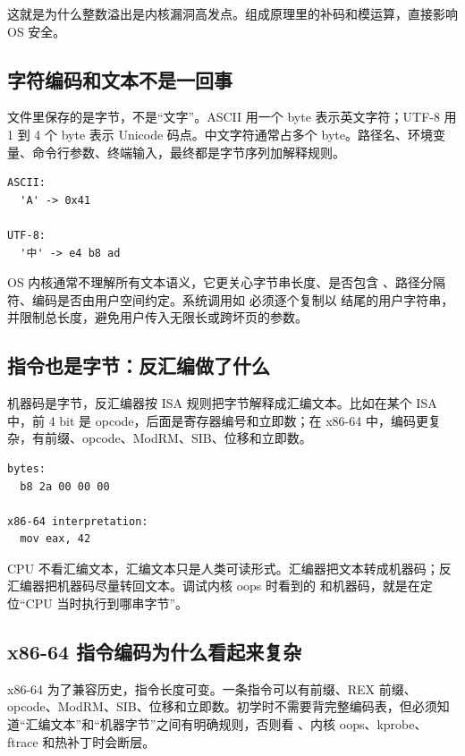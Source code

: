 这就是为什么整数溢出是内核漏洞高发点。组成原理里的补码和模运算，直接影响 OS 安全。

\subsection{字符编码和文本不是一回事}

文件里保存的是字节，不是“文字”。ASCII 用一个 byte 表示英文字符；UTF-8 用 1 到 4 个 byte 表示 Unicode 码点。中文字符通常占多个 byte。路径名、环境变量、命令行参数、终端输入，最终都是字节序列加解释规则。

\begin{lstlisting}
ASCII:
  'A' -> 0x41

UTF-8:
  '中' -> e4 b8 ad
\end{lstlisting}

OS 内核通常不理解所有文本语义，它更关心字节串长度、是否包含 、路径分隔符、编码是否由用户空间约定。系统调用如  必须逐个复制以  结尾的用户字符串，并限制总长度，避免用户传入无限长或跨坏页的参数。

\subsection{指令也是字节：反汇编做了什么}

机器码是字节，反汇编器按 ISA 规则把字节解释成汇编文本。比如在某个 ISA 中，前 4 bit 是 opcode，后面是寄存器编号和立即数；在 x86-64 中，编码更复杂，有前缀、opcode、ModRM、SIB、位移和立即数。

\begin{lstlisting}
bytes:
  b8 2a 00 00 00

x86-64 interpretation:
  mov eax, 42
\end{lstlisting}

CPU 不看汇编文本，汇编文本只是人类可读形式。汇编器把文本转成机器码；反汇编器把机器码尽量转回文本。调试内核 oops 时看到的  和机器码，就是在定位“CPU 当时执行到哪串字节”。

\subsection{x86-64 指令编码为什么看起来复杂}

x86-64 为了兼容历史，指令长度可变。一条指令可以有前缀、REX 前缀、opcode、ModRM、SIB、位移和立即数。初学时不需要背完整编码表，但必须知道“汇编文本”和“机器字节”之间有明确规则，否则看 、内核 oops、kprobe、ftrace 和热补丁时会断层。

